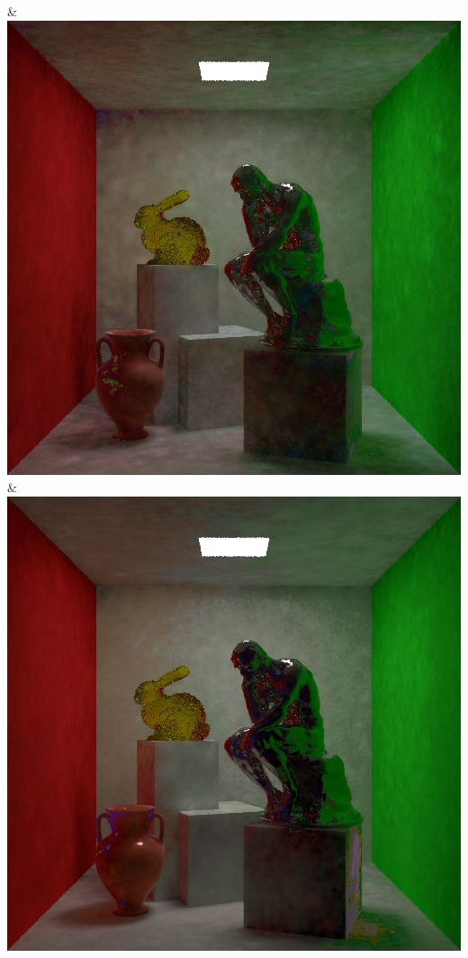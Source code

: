 & \includegraphics[width=\linewidth]{figures/py/tests/batch_size/100+nrc+pt+14@4_1spp.png}
& \includegraphics[width=\linewidth]{figures/py/tests/batch_size/500+nrc+pt+14@4_1spp.png}
